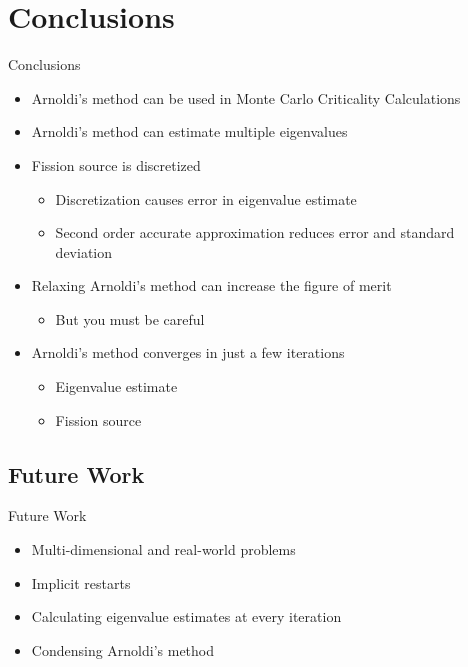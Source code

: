 \documentclass[xcolor={usenames, dvipsnames},]{beamer}
\begin{document}
\section{Conclusions}
\begin{frame}{Conclusions}
    \begin{itemize}[<+->]
        \item Arnoldi's method can be used in Monte Carlo Criticality Calculations
        \item Arnoldi's method can estimate multiple eigenvalues
        \item Fission source is discretized
        \begin{itemize}[<.->]
            \item Discretization causes error in eigenvalue estimate
            \item Second order accurate approximation reduces error and standard deviation
        \end{itemize}
        \item Relaxing Arnoldi's method can increase the figure of merit
        \begin{itemize}
            \item But you must be careful
        \end{itemize}
        \item Arnoldi's method converges in just a few iterations
        \begin{itemize}[<.->]
            \item Eigenvalue estimate
            \item Fission source
        \end{itemize}
    \end{itemize}
\end{frame}
\subsection{Future Work}
\begin{frame}{Future Work}
    \begin{itemize}
        \item Multi-dimensional and real-world problems
        \item Implicit restarts
        \item Calculating eigenvalue estimates at every iteration
        \item Condensing Arnoldi's method
    \end{itemize}
\end{frame}
\end{document}
